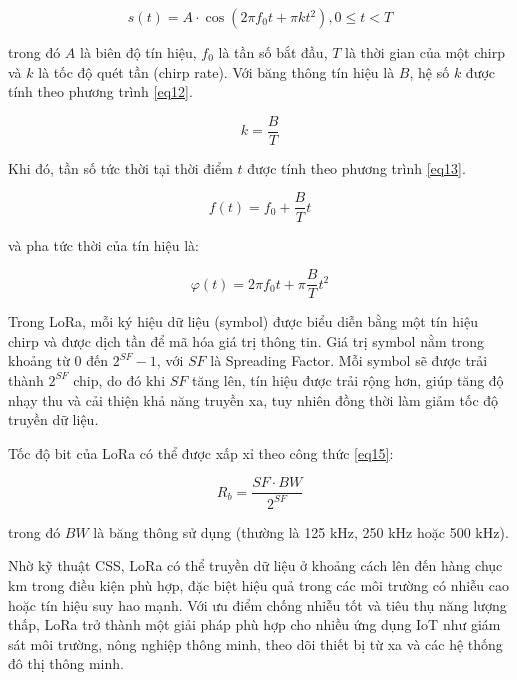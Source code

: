 \documentclass{article}
\begin{document}
	\begin{equation}\label{eq11}
		s(t) = A \cdot \cos \left(2\pi f_0 t + \pi k t^2\right), 0 \leq t < T
	\end{equation}
	
	trong đó $A$ là biên độ tín hiệu, $f_0$ là tần số bắt đầu, $T$ là thời gian của một chirp và $k$ là tốc độ quét tần (chirp rate). Với băng thông tín hiệu là $B$, hệ số $k$ được tính theo phương trình \ref{eq12}.
	
	\begin{equation}\label{eq12}
		k = \dfrac{B}{T}
	\end{equation}
	
	Khi đó, tần số tức thời tại thời điểm $t$ được tính theo phương trình \ref{eq13}.
	
	\begin{equation}\label{eq13}
		f(t) = f_0 + \dfrac{B}{T}t
	\end{equation}
	
	và pha tức thời của tín hiệu là:
	
	\begin{equation}\label{eq14}
		\varphi (t) = 2\pi f_0 t + \pi \dfrac{B}{T}t^2
	\end{equation}
	
	Trong LoRa, mỗi ký hiệu dữ liệu (symbol) được biểu diễn bằng một tín hiệu chirp và được dịch tần để mã hóa giá trị thông tin. Giá trị symbol nằm trong khoảng từ 0 đến $2^{SF} - 1$, với $SF$ là Spreading Factor. Mỗi symbol sẽ được trải thành $2^{SF}$ chip, do đó khi $SF$ tăng lên, tín hiệu được trải rộng hơn, giúp tăng độ nhạy thu và cải thiện khả năng truyền xa, tuy nhiên đồng thời làm giảm tốc độ truyền dữ liệu.
	
	Tốc độ bit của LoRa có thể được xấp xỉ theo công thức \ref{eq15}:
	
	\begin{equation}\label{eq15}
		R_b = \dfrac{SF \cdot BW}{2^{SF}}
	\end{equation}
	
	trong đó $BW$ là băng thông sử dụng (thường là 125 kHz, 250 kHz hoặc 500 kHz).
	
	Nhờ kỹ thuật CSS, LoRa có thể truyền dữ liệu ở khoảng cách lên đến hàng chục km trong điều kiện phù hợp, đặc biệt hiệu quả trong các môi trường có nhiễu cao hoặc tín hiệu suy hao mạnh. Với ưu điểm chống nhiễu tốt và tiêu thụ năng lượng thấp, LoRa trở thành một giải pháp phù hợp cho nhiều ứng dụng IoT như giám sát môi trường, nông nghiệp thông minh, theo dõi thiết bị từ xa và các hệ thống đô thị thông minh.
	
\end{document}
